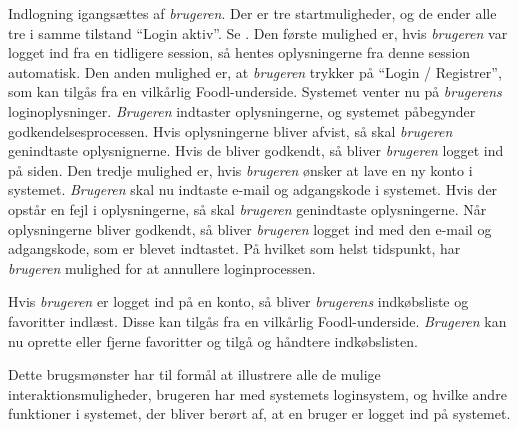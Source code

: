 {Indlogning igangsættes af \textit{brugeren}. Der er tre startmuligheder, og de ender alle tre i samme tilstand “Login aktiv”. Se . Den første mulighed er, hvis \textit{brugeren} var logget ind fra en tidligere session, så hentes oplysningerne fra denne session automatisk. Den anden mulighed er, at \textit{brugeren} trykker på “Login / Registrer”, som kan tilgås fra en vilkårlig Foodl-underside. Systemet venter nu på \textit{brugerens} loginoplysninger. \textit{Brugeren} indtaster oplysningerne, og systemet påbegynder godkendelsesprocessen. Hvis oplysningerne bliver afvist, så skal \textit{brugeren} genindtaste oplysnignerne. Hvis de bliver godkendt, så bliver \textit{brugeren} logget ind på siden. Den tredje mulighed er, hvis \textit{brugeren} ønsker at lave en ny konto i systemet. \textit{Brugeren} skal nu indtaste e-mail og adgangskode i systemet. Hvis der opstår en fejl i oplysningerne, så skal \textit{brugeren} genindtaste oplysningerne. Når oplysningerne bliver godkendt, så bliver \textit{brugeren} logget ind med den e-mail og adgangskode, som er blevet indtastet. På hvilket som helst tidspunkt, har \textit{brugeren} mulighed for at annullere loginprocessen.

Hvis \textit{brugeren} er logget ind på en konto, så bliver \textit{brugerens} indkøbsliste og favoritter indlæst. Disse kan tilgås fra en vilkårlig Foodl-underside. \textit{Brugeren} kan nu oprette eller fjerne favoritter og tilgå og håndtere indkøbslisten.}
{}
{}
{Dette brugsmønster har til formål at illustrere alle de mulige interaktionsmuligheder, brugeren har med systemets loginsystem, og hvilke andre funktioner i systemet, der bliver berørt af, at en bruger er logget ind på systemet.}